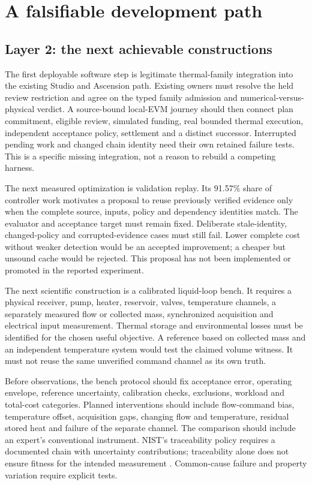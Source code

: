 \documentclass[11pt,a4paper]{article}
\begin{document}
\section{A falsifiable development path}\label{sec:path}
\subsection{Layer 2: the next achievable constructions}
The first deployable software step is legitimate thermal-family integration into the existing Studio and Ascension path. Existing owners must resolve the held review restriction and agree on the typed family admission and numerical-versus-physical verdict. A source-bound local-EVM journey should then connect plan commitment, eligible review, simulated funding, real bounded thermal execution, independent acceptance policy, settlement and a distinct successor. Interrupted pending work and changed chain identity need their own retained failure tests. This is a specific missing integration, not a reason to rebuild a competing harness.

The next measured optimization is validation replay. Its 91.57\% share of controller work motivates a proposal to reuse previously verified evidence only when the complete source, inputs, policy and dependency identities match. The evaluator and acceptance target must remain fixed. Deliberate stale-identity, changed-policy and corrupted-evidence cases must still fail. Lower complete cost without weaker detection would be an accepted improvement; a cheaper but unsound cache would be rejected. This proposal has not been implemented or promoted in the reported experiment.

The next scientific construction is a calibrated liquid-loop bench. It requires a physical receiver, pump, heater, reservoir, valves, temperature channels, a separately measured flow or collected mass, synchronized acquisition and electrical input measurement. Thermal storage and environmental losses must be identified for the chosen useful objective. A reference based on collected mass and an independent temperature system would test the claimed volume witness. It must not reuse the same unverified command channel as its own truth.

Before observations, the bench protocol should fix acceptance error, operating envelope, reference uncertainty, calibration checks, exclusions, workload and total-cost categories. Planned interventions should include flow-command bias, temperature offset, acquisition gaps, changing flow and temperature, residual stored heat and failure of the separate channel. The comparison should include an expert's conventional instrument. NIST's traceability policy requires a documented chain with uncertainty contributions; traceability alone does not ensure fitness for the intended measurement \cite{nisttraceability}. Common-cause failure and property variation require explicit tests.
\end{document}
